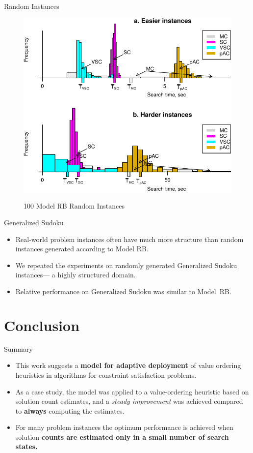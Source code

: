 \documentclass{beamer}
\begin{document}
\begin{frame}{Random Instances}
\begin{figure}[h] 
\centering
\includegraphics[scale=0.6]{random-problems-arrows+legend.pdf}

100 Model RB Random Instances
\end{figure}
\end{frame}

\begin{frame}{Generalized Sudoku}
\begin{itemize}
\item Real-world problem instances often have much more structure
  than random instances generated according to Model RB.
\item We repeated the
  experiments on randomly generated Generalized Sudoku instances---
  a highly structured domain.
\item Relative performance on Generalized Sudoku was similar to
  Model~RB.
\end{itemize}
\end{frame}

\section{Conclusion}

 \begin{frame}{Summary}
\begin{itemize}
\item This work suggests a {\bf model for adaptive deployment} of value ordering
      heuristics in algorithms for constraint satisfaction problems.
\item As a case study, the model was applied to a value-ordering heuristic based
      on solution count estimates, and a {\it steady improvement}  was achieved
      compared to {\bf always} computing the estimates.  
\item For many problem instances the optimum
      performance is achieved when solution {\bf counts are estimated only in a
      small number of search states.}
\end{itemize}
\end{frame}
\end{document}
